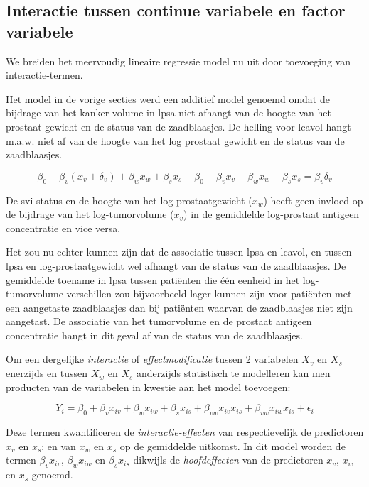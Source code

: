 \documentclass[
  12pt,dutch,coursenotes]{book}
\theoremstyle{definition}
\theoremstyle{definition}
\theoremstyle{definition}
\theoremstyle{remark}
\begin{document}
\hypertarget{interactie-tussen-continue-variabele-en-factor-variabele}{%
\subsection{Interactie tussen continue variabele en factor variabele}\label{interactie-tussen-continue-variabele-en-factor-variabele}}

We breiden het meervoudig lineaire regressie model nu uit door toevoeging van interactie-termen.

Het model in de vorige secties werd een additief model genoemd omdat de bijdrage van het kanker volume in lpsa niet afhangt van de hoogte van het prostaat gewicht en de status van de zaadblaasjes. De helling voor lcavol hangt m.a.w. niet af van de hoogte van het log prostaat gewicht en de status van de zaadblaasjes.

\[
\beta_0 + \beta_v (x_{v}+\delta_v) + \beta_w x_{w} +\beta_s x_{s} - \beta_0 - \beta_v x_{v} - \beta_w x_{w} -\beta_s x_s = \beta_v \delta_v
\]

De svi status en de hoogte van het log-prostaatgewicht (\(x_w\)) heeft geen invloed op de bijdrage van het log-tumorvolume (\(x_v\)) in de gemiddelde log-prostaat antigeen concentratie en vice versa.

Het zou nu echter kunnen zijn dat de associatie tussen lpsa en lcavol, en tussen lpsa en log-prostaatgewicht wel afhangt van de status van de zaadblaasjes. De gemiddelde toename in lpsa tussen patiënten die één eenheid in het log-tumorvolume verschillen zou bijvoorbeeld lager kunnen zijn voor patiënten met een aangetaste zaadblaasjes dan bij patiënten waarvan de zaadblaasjes niet zijn aangetast. De associatie van het tumorvolume en de prostaat antigeen concentratie hangt in dit geval af van de status van de zaadblaasjes.

Om een dergelijke \textit{interactie} of \textit{effectmodificatie} tussen 2 variabelen \(X_v\) en \(X_s\) enerzijds en tussen \(X_w\) en \(X_s\) anderzijds statistisch te modelleren kan men producten van de variabelen in kwestie aan het model toevoegen:

\[
Y_i = \beta_0 + \beta_v x_{iv} + \beta_w x_{iw} +\beta_s x_{is} + \beta_{vw} x_{iv}x_{is} + \beta_{vw} x_{iw}x_{is} +\epsilon_i
\]

Deze termen kwantificeren de \emph{interactie-effecten} van respectievelijk de predictoren \(x_v\) en \(x_s\); en van \(x_w\) en \(x_s\) op de gemiddelde uitkomst.
In dit model worden de termen \(\beta_vx_{iv}\), \(\beta_wx_{iw}\) en \(\beta_sx_{is}\) dikwijls de \emph{hoofdeffecten} van de predictoren \(x_v\), \(x_w\) en \(x_s\) genoemd.
\end{document}
